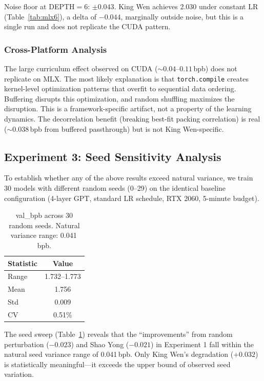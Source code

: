 \documentclass{article}
\begin{document}
Noise floor at DEPTH${}=6$: $\pm 0.043$. King Wen achieves 2.030 under constant LR (Table~\ref{tab:mlx6}), a delta of $-0.044$, marginally outside noise, but this is a single run and does not replicate the CUDA pattern.

\subsubsection{Cross-Platform Analysis}

The large curriculum effect observed on CUDA (${\sim}0.04$--$0.11$\,bpb) does not replicate on MLX. The most likely explanation is that \texttt{torch.compile} creates kernel-level optimization patterns that overfit to sequential data ordering. Buffering disrupts this optimization, and random shuffling maximizes the disruption. This is a framework-specific artifact, not a property of the learning dynamics. The decorrelation benefit (breaking best-fit packing correlation) is real (${\sim}0.038$\,bpb from buffered passthrough) but is not King Wen-specific.

\subsection{Experiment 3: Seed Sensitivity Analysis}\label{sec:seeds}

To establish whether any of the above results exceed natural variance, we train 30 models with different random seeds (0--29) on the identical baseline configuration (4-layer GPT, standard LR schedule, RTX 2060, 5-minute budget).

\begin{table}[h]
\centering
\begin{tabular}{lc}
\toprule
\textbf{Statistic} & \textbf{Value} \\
\midrule
Range & 1.732--1.773 \\
Mean & 1.756 \\
Std & 0.009 \\
CV & 0.51\% \\
\bottomrule
\end{tabular}
\caption{val\_bpb across 30 random seeds. Natural variance range: 0.041\,bpb.}
\label{tab:seeds}
\end{table}

The seed sweep (Table~\ref{tab:seeds}) reveals that the ``improvements'' from random perturbation ($-0.023$) and Shao Yong ($-0.021$) in Experiment 1 fall within the natural seed variance range of 0.041\,bpb. Only King Wen's degradation ($+0.032$) is statistically meaningful---it exceeds the upper bound of observed seed variation.
\end{document}
